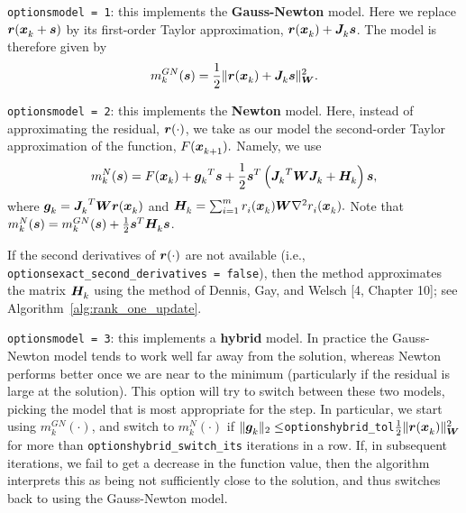 \begin{description}
  \item {\tt options\ct model = 1}: this implements the {\bf Gauss-Newton} model.  Here we replace $\vr(\iter[k]{\vx} + \vs)$ by its first-order Taylor approximation, $\vr(\iter{\vx}) + \iter{\vJ}\vs$. The model is therefore given by    \begin{equation}
m_k^{GN}(\vs) = \frac{1}{2} \|\vr(\iter{\vx}) + \iter{\vJ}\vs\|_\vW^2.
\label{eq:gauss-newton-model}
\end{equation}
\item {\tt options\ct model = 2}: this implements the {\bf Newton} model.
Here, instead of approximating the residual, $\vr(\cdot)$, we take as our model the second-order Taylor approximation of the function, $F(\iter[k+1]{\vx}).$  Namely, we use
\begin{equation}
  \label{eq:newton-model}
  m_k^{N}(\vs) = F(\iter{\vx}) + {\iter{\vg}}^T\vs + \frac{1}{2}\vs^T\left( {\iter{\vJ}}^T \vW \iter{\vJ} + \iter{\vH}\right) \vs,
\end{equation}
where $\iter{\vg} = {\iter{\vJ}}^T\vW \vr(\iter{\vx})$ and $\iter{\vH} = \sum_{i=1}^m\iter[i]{r}(\iter{\vx}) \vW \nabla^2 \iter[i]{r}(\iter{\vx}).$
Note that $m_k^{N}(\vs) = m_k^{GN}(\vs) + \frac{1}{2}\vs^T\iter{\vH} \vs$.

If the second derivatives of $\vr(\cdot)$ are not available
(i.e., {\tt options\ct exact\_second\_derivatives = false}),
then the method approximates the matrix $\iter{\vH}$ using the method of Dennis, Gay, and Welsch [4, Chapter 10];
see Algorithm~\ref{alg:rank_one_update}.


\item {\tt options\ct model = 3}: this implements a {\bf hybrid} model.
In practice the Gauss-Newton model tends to work well far away from the solution, whereas
Newton performs better once we are near to the minimum (particularly if the residual is
large at the solution).
This option will try to switch between these two models, picking the model that is most appropriate for the step.
In particular, we start using $m_k^{GN}(\cdot)$,
and switch to $m_k^{N}(\cdot)$ if $\|{\iter{\vg}}\|_2 \leq ${\tt options\ct hybrid\_tol}$\frac{1}{2}\|\vr(\iter{\vx})\|^2_\vW$ for more than {\tt options\ct hybrid\_switch\_its} iterations in a row. If, in subsequent iterations, we fail to get
a decrease in the function value, then the algorithm interprets this as being not sufficiently close to the solution, and thus switches back to using the Gauss-Newton model.


\end{description}
